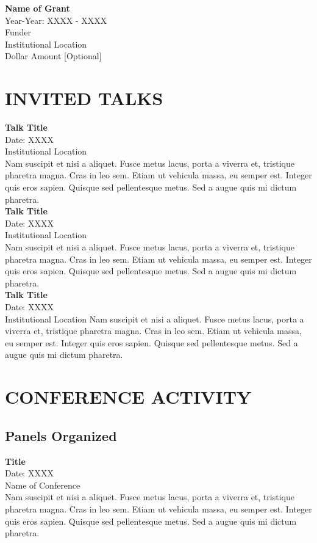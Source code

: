\documentclass[a4paper,9pt]{extarticle}
\begin{document}
\noindent
\textbf{Name of Grant} \\ 
Year-Year: XXXX - XXXX\\
Funder \\
Institutional Location \\
Dollar Amount [Optional]  


\section*{INVITED TALKS}

\noindent
\newline 
\textbf{Talk Title} \\ 
Date: XXXX \\
Institutional Location \\
Nam suscipit et nisi a aliquet. Fusce metus lacus, porta a viverra et, tristique pharetra magna. Cras in leo sem. Etiam ut vehicula massa, eu semper est. Integer quis eros sapien. Quisque sed pellentesque metus. Sed a augue quis mi dictum pharetra. \\

\noindent
\textbf{Talk Title} \\ 
Date: XXXX \\
Institutional Location \\
Nam suscipit et nisi a aliquet. Fusce metus lacus, porta a viverra et, tristique pharetra magna. Cras in leo sem. Etiam ut vehicula massa, eu semper est. Integer quis eros sapien. Quisque sed pellentesque metus. Sed a augue quis mi dictum pharetra. \\

\noindent
\textbf{Talk Title} \\ 
Date: XXXX \\
Institutional Location 
Nam suscipit et nisi a aliquet. Fusce metus lacus, porta a viverra et, tristique pharetra magna. Cras in leo sem. Etiam ut vehicula massa, eu semper est. Integer quis eros sapien. Quisque sed pellentesque metus. Sed a augue quis mi dictum pharetra. 


\section*{CONFERENCE ACTIVITY}
\subsection*{Panels Organized}
\textbf{Title} \\
Date: XXXX \\
Name of Conference \\
Nam suscipit et nisi a aliquet. Fusce metus lacus, porta a viverra et, tristique pharetra magna. Cras in leo sem. Etiam ut vehicula massa, eu semper est. Integer quis eros sapien. Quisque sed pellentesque metus. Sed a augue quis mi dictum pharetra. 
\end{document}
